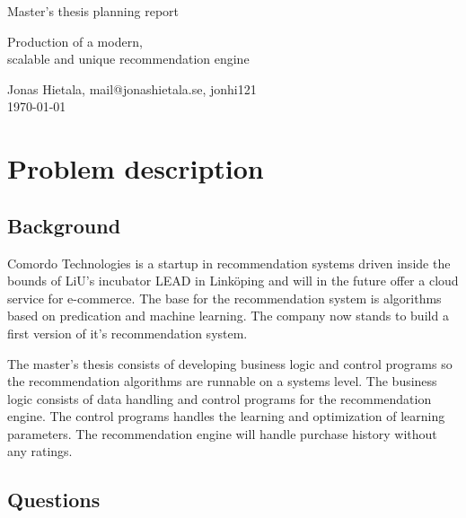 \documentclass[11pt]{article}
\begin{document}
\begin{center}


{ \Large Master's thesis planning report\\[0.5cm] }

{ \LARGE Production of a modern, \\scalable and unique recommendation engine \\[0.4cm] }

Jonas Hietala, mail@jonashietala.se, jonhi121 \\[0.2cm]

\today

\end{center}


\section*{Problem description}

\subsection*{Background}

Comordo Technologies is a startup in recommendation systems driven inside the bounds of LiU's incubator LEAD in Linköping and will in the future offer a cloud service for e-commerce. The base for the recommendation system is algorithms based on predication and machine learning. The company now stands to build a first version of it's recommendation system.

The master's thesis consists of developing business logic and control programs so the recommendation algorithms are runnable on a systems level. The business logic consists of data handling and control programs for the recommendation engine. The control programs handles the learning and optimization of learning parameters. The recommendation engine will handle purchase history without any ratings.

\newpage


\subsection*{Questions}
\end{document}
